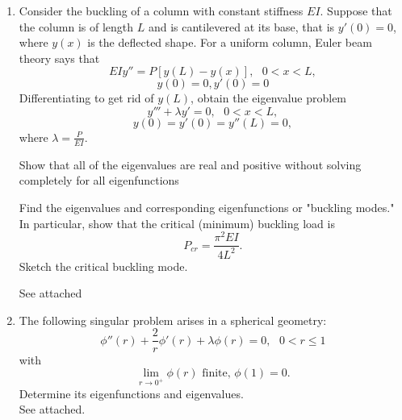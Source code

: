 \documentclass[12pt]{article}
\numberwithin{equation}{section}
\begin{document}
\begin{enumerate}
    \item Consider the buckling of a column with constant stiffness $EI$. Suppose that the column is of length $L$ and is cantilevered at its base, that is $y'(0)=0$, where $y(x)$ is the deflected shape. For a uniform column, Euler beam theory says that
        $$EIy''=P[y(L)-y(x)],\text{  }0<x<L,$$
        $$y(0)=0,y'(0)=0$$
        Differentiating to get rid of $y(L)$, obtain the eigenvalue problem
        $$y'''+\lambda y'=0,\text{  }0<x<L,$$
        $$y(0)=y'(0)=y''(L)=0,$$
        where $\lambda=\frac{P}{EI}$.

        Show that all of the eigenvalues are real and positive without solving completely for all eigenfunctions

        Find the eigenvalues and corresponding eigenfunctions or "buckling modes." In particular, show that the critical (minimum) buckling load is
        $$P_{cr}=\frac{\pi^2 EI}{4L^2}.$$
        Sketch the critical buckling mode.
        
        See attached
    \item The following singular problem arises in a spherical geometry:
    $$\phi''(r)+\frac{2}{r}\phi'(r)+\lambda\phi(r)=0,\text{  }0< r\leq 1$$
    with
    $$\lim_{r\to0^+}\phi(r)\text{ finite, }\phi(1)=0.$$
    Determine its eigenfunctions and eigenvalues.\\
    
    See attached.
\end{enumerate}
\end{document}

